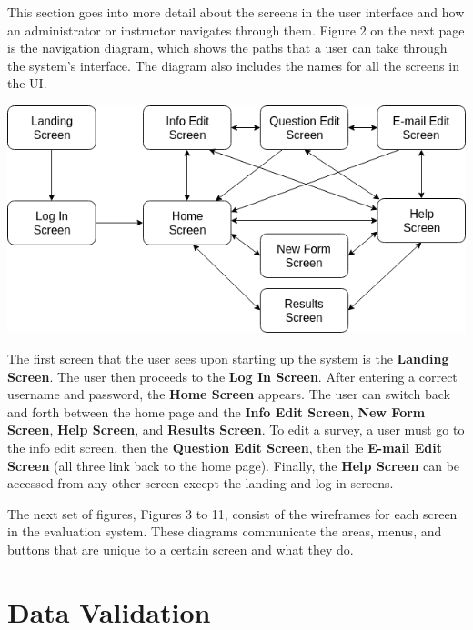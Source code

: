 \documentclass{article}
\begin{document}
This section goes into more detail about the screens in the user interface and how an administrator or instructor navigates through them. Figure 2 on the next page is the navigation diagram, which shows the paths that a user can take through the system's interface. The diagram also includes the names for all the screens in the UI.

\newpage

\begin{center}
\vspace{3mm}
{\includegraphics[scale=0.6]{images/navigation_diagram.png}}
\vspace{2mm}
\end{center}

The first screen that the user sees upon starting up the system is the \textbf{Landing Screen}. The user then proceeds to the \textbf{Log In Screen}. After entering a correct username and password, the \textbf{Home Screen} appears. The user can switch back and forth between the home page and the \textbf{Info Edit Screen}, \textbf{New Form Screen}, \textbf{Help Screen}, and \textbf{Results Screen}. To edit a survey, a user must go to the info edit screen, then the \textbf{Question Edit Screen}, then the \textbf{E-mail Edit Screen} (all three link back to the home page). Finally, the \textbf{Help Screen} can be accessed from any other screen except the landing and log-in screens.

The next set of figures, Figures 3 to 11, consist of the wireframes for each screen in the evaluation system. These diagrams communicate the areas, menus, and buttons that are unique to a certain screen and what they do.


\section{Data Validation}
\end{document}
